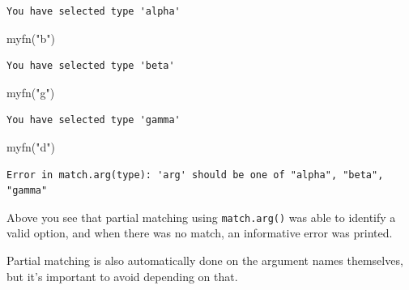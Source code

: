 \documentclass[
]{book}
\newenvironment{Shaded}{\begin{snugshade}}{\end{snugshade}}
\newcommand{\FunctionTok}[1]{\textcolor[rgb]{0.00,0.00,0.00}{#1}}
\newcommand{\NormalTok}[1]{#1}
\newcommand{\StringTok}[1]{\textcolor[rgb]{0.31,0.60,0.02}{#1}}
\begin{document}
\begin{verbatim}
You have selected type 'alpha'
\end{verbatim}

\begin{Shaded}
\begin{Highlighting}[]
\FunctionTok{myfn}\NormalTok{(}\StringTok{"b"}\NormalTok{)}
\end{Highlighting}
\end{Shaded}

\begin{verbatim}
You have selected type 'beta'
\end{verbatim}

\begin{Shaded}
\begin{Highlighting}[]
\FunctionTok{myfn}\NormalTok{(}\StringTok{"g"}\NormalTok{)}
\end{Highlighting}
\end{Shaded}

\begin{verbatim}
You have selected type 'gamma'
\end{verbatim}

\begin{Shaded}
\begin{Highlighting}[]
\FunctionTok{myfn}\NormalTok{(}\StringTok{"d"}\NormalTok{)}
\end{Highlighting}
\end{Shaded}

\begin{verbatim}
Error in match.arg(type): 'arg' should be one of "alpha", "beta", "gamma"
\end{verbatim}

Above you see that partial matching using \texttt{match.arg()} was able to identify a valid option, and when there was no match, an informative error was printed.

Partial matching is also automatically done on the argument names themselves, but it's important to avoid depending on that.
\end{document}
